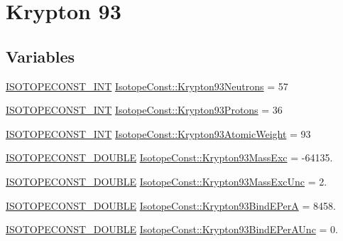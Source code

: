 \hypertarget{group___isotope_const-_krypton-_kr93}{}\section{Krypton 93}
\label{group___isotope_const-_krypton-_kr93}
\subsection*{Variables}
\begin{DoxyCompactItemize}
\item 
\mbox{\hyperlink{group___isotope_const-_macros_ga5f18360b3e99483a35c32d789e62621c}{I\+S\+O\+T\+O\+P\+E\+C\+O\+N\+S\+T\+\_\+\+I\+NT}} \mbox{\hyperlink{group___isotope_const-_krypton-_kr93_ga5596205e545192dffc608330f17145cb}{Isotope\+Const\+::\+Krypton93\+Neutrons}} = 57
\item 
\mbox{\hyperlink{group___isotope_const-_macros_ga5f18360b3e99483a35c32d789e62621c}{I\+S\+O\+T\+O\+P\+E\+C\+O\+N\+S\+T\+\_\+\+I\+NT}} \mbox{\hyperlink{group___isotope_const-_krypton-_kr93_ga0ee4a7f8ffd25daf11d9f96339dfe742}{Isotope\+Const\+::\+Krypton93\+Protons}} = 36
\item 
\mbox{\hyperlink{group___isotope_const-_macros_ga5f18360b3e99483a35c32d789e62621c}{I\+S\+O\+T\+O\+P\+E\+C\+O\+N\+S\+T\+\_\+\+I\+NT}} \mbox{\hyperlink{group___isotope_const-_krypton-_kr93_gab248263936d1790347a4a6ba837237ef}{Isotope\+Const\+::\+Krypton93\+Atomic\+Weight}} = 93
\item 
\mbox{\hyperlink{group___isotope_const-_macros_ga8f45a7272ce02c0b4c65c44636ed719a}{I\+S\+O\+T\+O\+P\+E\+C\+O\+N\+S\+T\+\_\+\+D\+O\+U\+B\+LE}} \mbox{\hyperlink{group___isotope_const-_krypton-_kr93_ga0bd92b3bb90506dab1085a4b6b076185}{Isotope\+Const\+::\+Krypton93\+Mass\+Exc}} = -\/64135.
\item 
\mbox{\hyperlink{group___isotope_const-_macros_ga8f45a7272ce02c0b4c65c44636ed719a}{I\+S\+O\+T\+O\+P\+E\+C\+O\+N\+S\+T\+\_\+\+D\+O\+U\+B\+LE}} \mbox{\hyperlink{group___isotope_const-_krypton-_kr93_ga934c518e6e6dc5553d2c82961b1fc867}{Isotope\+Const\+::\+Krypton93\+Mass\+Exc\+Unc}} = 2.
\item 
\mbox{\hyperlink{group___isotope_const-_macros_ga8f45a7272ce02c0b4c65c44636ed719a}{I\+S\+O\+T\+O\+P\+E\+C\+O\+N\+S\+T\+\_\+\+D\+O\+U\+B\+LE}} \mbox{\hyperlink{group___isotope_const-_krypton-_kr93_ga20011cf42ad32adff1cc835c751d1ef3}{Isotope\+Const\+::\+Krypton93\+Bind\+E\+PerA}} = 8458.
\item 
\mbox{\hyperlink{group___isotope_const-_macros_ga8f45a7272ce02c0b4c65c44636ed719a}{I\+S\+O\+T\+O\+P\+E\+C\+O\+N\+S\+T\+\_\+\+D\+O\+U\+B\+LE}} \mbox{\hyperlink{group___isotope_const-_krypton-_kr93_ga8dc45219499caa3d8e4f8d0579df9e22}{Isotope\+Const\+::\+Krypton93\+Bind\+E\+Per\+A\+Unc}} = 0.

\end{DoxyCompactItemize}
